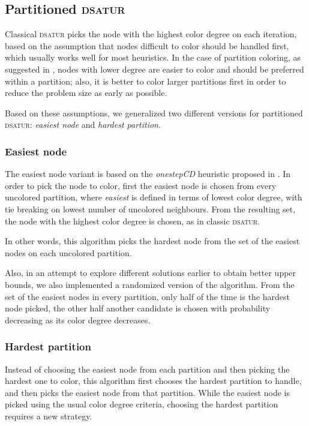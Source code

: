 \subsection{Partitioned \textsc{dsatur}}
\label{subsec:heur:pdsatur}

Classical \textsc{dsatur} picks the node with the highest color degree on each iteration, based on the assumption that nodes difficult to color should be handled first, which usually works well for most heuristics. In the case of partition coloring, as suggested in \cite{Li00thepartition}, nodes with lower degree are easier to color and should be preferred within a partition; also, it is better to color larger partitions first in order to reduce the problem size as early as possible.

Based on these assumptions, we generalized two different versions for partitioned \textsc{dsatur}: \textit{easiest node} and \textit{hardest partition}.

\subsubsection*{Easiest node}

The easiest node variant is based on the \textit{onestepCD} heuristic proposed in \cite{Li00thepartition}. In order to pick the node to color, first the easiest node is chosen from every uncolored partition, where \textit{easiest} is defined in terms of lowest color degree, with tie breaking on lowest number of uncolored neighbours. From the resulting set, the node with the highest color degree is chosen, as in classic \textsc{dsatur}. 

In other words, this algorithm picks the hardest node from the set of the easiest nodes on each uncolored partition.

Also, in an attempt to explore different solutions earlier to obtain better upper bounds, we also implemented a randomized version of the algorithm. From the set of the easiest nodes in every partition, only half of the time is the hardest node picked, the other half another candidate is chosen with probability decreasing as its color degree decreases.

\subsubsection*{Hardest partition}

Instead of choosing the easiest node from each partition and then picking the hardest one to color, this algorithm first chooses the hardest partition to handle, and then picks the easiest node from that partition. While the easiest node is picked using the usual color degree criteria, choosing the hardest partition requires a new strategy. 

